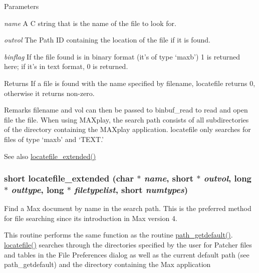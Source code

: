 \begin{DoxyParams}{Parameters}
\item[{\em name}]A C string that is the name of the file to look for. \item[{\em outvol}]The Path ID containing the location of the file if it is found. \item[{\em binflag}]If the file found is in binary format (it’s of type ‘maxb’) 1 is returned here; if it’s in text format, 0 is returned.\end{DoxyParams}
\begin{DoxyReturn}{Returns}
If a file is found with the name specified by filename, locatefile returns 0, otherwise it returns non-\/zero.
\end{DoxyReturn}
\begin{DoxyRemark}{Remarks}
filename and vol can then be passed to binbuf\_\-read to read and open file the file. When using MAXplay, the search path consists of all subdirectories of the directory containing the MAXplay application. locatefile only searches for files of type ‘maxb’ and ‘TEXT.’
\end{DoxyRemark}
\begin{DoxySeeAlso}{See also}
\hyperlink{group__files_gaa2899b66e1457da0ee333f9407230ccd}{locatefile\_\-extended()} 
\end{DoxySeeAlso}
\hypertarget{group__files_gaa2899b66e1457da0ee333f9407230ccd}{
\subsubsection[{locatefile\_\-extended}]{\setlength{\rightskip}{0pt plus 5cm}short locatefile\_\-extended (char $\ast$ {\em name}, \/  short $\ast$ {\em outvol}, \/  long $\ast$ {\em outtype}, \/  long $\ast$ {\em filetypelist}, \/  short {\em numtypes})}}
\label{group__files_gaa2899b66e1457da0ee333f9407230ccd}


Find a Max document by name in the search path. This is the preferred method for file searching since its introduction in Max version 4.

This routine performs the same function as the routine \hyperlink{group__files_ga6be29f366820a4cd2aa4f77bcfad362e}{path\_\-getdefault()}. \hyperlink{group__files_ga4d2637351d4a98b83e9a59ef7d500568}{locatefile()} searches through the directories specified by the user for Patcher files and tables in the File Preferences dialog as well as the current default path (see path\_\-getdefault) and the directory containing the Max application

